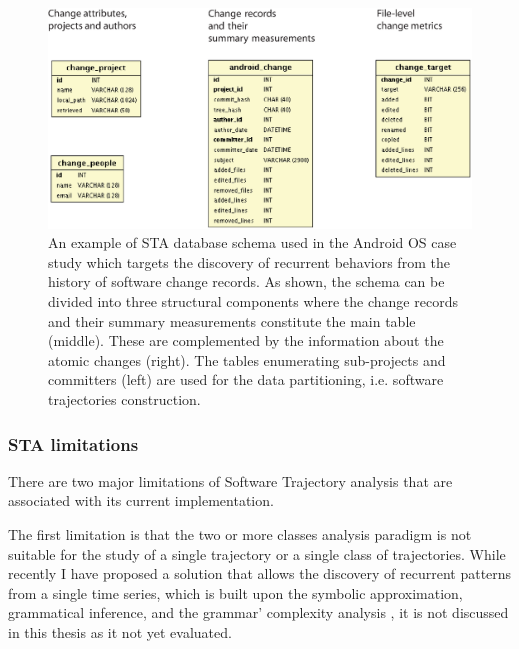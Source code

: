 \begin{figure}[t]
   \centering
   \includegraphics[width=150mm]{figures/sta-schema.eps}
   \caption{An example of STA database schema used in the Android OS case study which targets the discovery of
   recurrent behaviors from the history of software change records. As shown, the schema can be divided into three 
   structural components where the change records and their summary measurements constitute the main table (middle).
   These are complemented by the information about the atomic changes (right). 
   The tables enumerating sub-projects and committers (left) are used for the data partitioning, i.e. software trajectories construction.}
   \label{fig:db-schema}
\end{figure}

\subsubsection{STA limitations}\label{sta_limitations}
There are two major limitations of Software Trajectory analysis that are associated with its current implementation.

The first limitation is that the two or more classes analysis paradigm is not suitable for the study of a single trajectory or a single class of trajectories. While recently I have proposed a solution that allows the discovery of recurrent patterns from a single time series, which is built upon the symbolic approximation, grammatical inference, and the grammar' complexity analysis \cite{grammarviz2}, it is not discussed in this thesis as it not yet evaluated.

